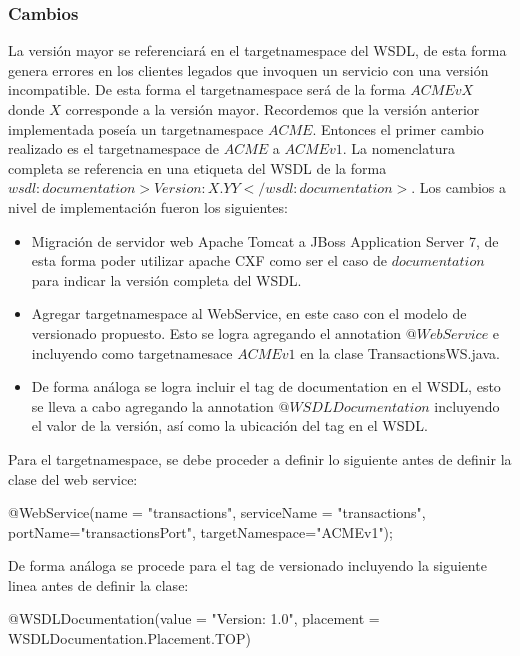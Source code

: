 \documentclass[12pt]{article}
\begin{document}
\subsubsection{Cambios}
La versión mayor se referenciará en el targetnamespace del WSDL, de esta forma genera errores en los clientes legados que invoquen un servicio con una versión incompatible. De esta forma el targetnamespace será de la forma $ACMEvX$ donde $X$ corresponde a la versión mayor. Recordemos que la versión anterior implementada poseía un targetnamespace $ACME$. Entonces el primer cambio realizado es el targetnamespace de $ACME$ a $ACMEv1$.
La nomenclatura completa se referencia en una etiqueta del WSDL de la forma $wsdl:documentation>Version: X.YY</wsdl:documentation>$.
Los cambios a nivel de implementación fueron los siguientes:
\begin{itemize}
  \item Migración de servidor web Apache Tomcat a JBoss Application Server 7, de esta forma poder utilizar apache CXF como ser el caso de $documentation$ para indicar la versión completa del WSDL.
  \item Agregar targetnamespace al WebService, en este caso con el modelo de versionado propuesto. Esto se logra agregando el annotation $@WebService$ e incluyendo como targetnamesace $ACMEv1$ en la clase TransactionsWS.java.
  \item De forma análoga se logra incluir el tag de documentation en el WSDL, esto se lleva a cabo agregando la annotation $@WSDLDocumentation$ incluyendo el valor de la versión, así como la ubicación del tag en el WSDL.
\end{itemize}


Para el targetnamespace, se debe proceder a definir lo siguiente antes de definir la clase del web service:
\begin{center}
    @WebService(name = "transactions", serviceName = "transactions", 
                portName="transactionsPort", targetNamespace="ACMEv1");
\end{center}

De forma análoga se procede para el tag de versionado incluyendo la siguiente linea antes de definir la clase:
\begin{center}
  @WSDLDocumentation(value = "Version: 1.0", placement = WSDLDocumentation.Placement.TOP)
\end{center}

%
%
\end{document}
